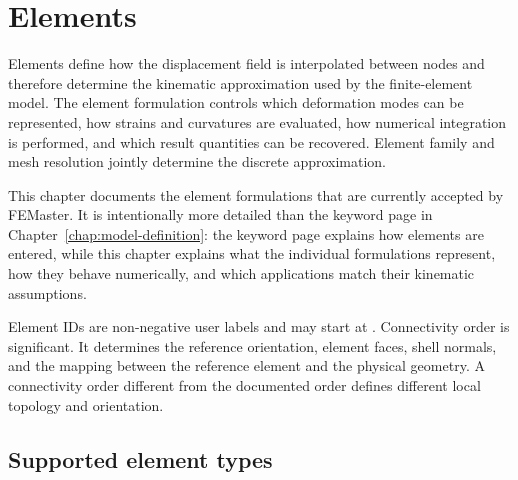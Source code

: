\chapter{Elements}
\label{chap:elements}

Elements define how the displacement field is interpolated between nodes and therefore determine the kinematic approximation used by the finite-element model. The element formulation controls which deformation modes can be represented, how strains and curvatures are evaluated, how numerical integration is performed, and which result quantities can be recovered. Element family and mesh resolution jointly determine the discrete approximation.

This chapter documents the element formulations that are currently accepted by FEMaster. It is intentionally more detailed than the  keyword page in Chapter~\ref{chap:model-definition}: the keyword page explains how elements are entered, while this chapter explains what the individual formulations represent, how they behave numerically, and which applications match their kinematic assumptions.

Element IDs are non-negative user labels and may start at . Connectivity order is significant. It determines the reference orientation, element faces, shell normals, and the mapping between the reference element and the physical geometry. A connectivity order different from the documented order defines different local topology and orientation.

\section{Supported element types}

